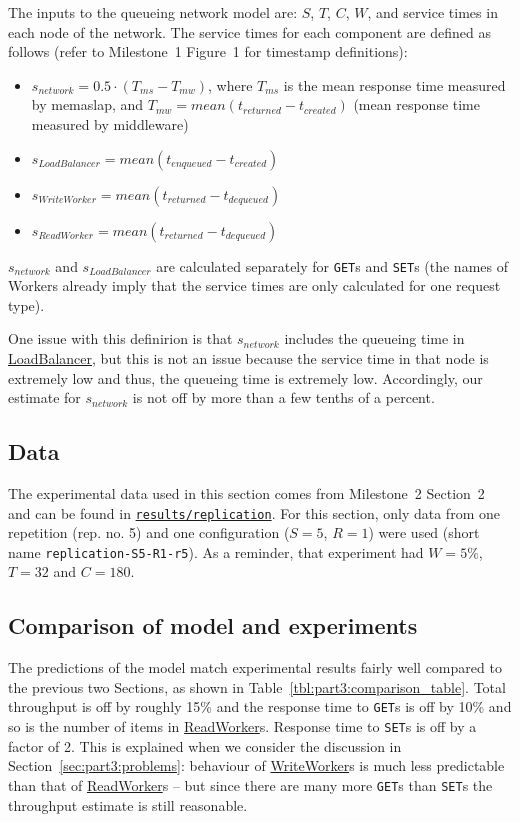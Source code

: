 \documentclass[11pt]{article}
\newcommand{\get}[0]{\texttt{GET}}
\newcommand{\set}[0]{\texttt{SET}}
\newcommand{\linkmain}[1]{\href{https://gitlab.inf.ethz.ch/pungast/asl-fall16-project/blob/master/src/main/java/asl/#1.java}{#1}}
\begin{document}
The inputs to the queueing network model are: $S$, $T$, $C$, $W$, and service times in each node of the network. The service times for each component are defined as follows (refer to Milestone~1 Figure~1 for timestamp definitions):

\begin{itemize}
	\item $s_{network} = 0.5 \cdot (T_{ms} - T_{mw})$, where $T_{ms}$ is the mean response time measured by memaslap, and $T_{mw} = mean(t_{returned}-t_{created})$ (mean response time measured by middleware)
	\item $s_{LoadBalancer} = mean(t_{enqueued}-t_{created})$
	\item $s_{WriteWorker} = mean(t_{returned}-t_{dequeued})$
	\item $s_{ReadWorker} = mean(t_{returned}-t_{dequeued})$
\end{itemize}

$s_{network}$ and $s_{LoadBalancer}$ are calculated separately for \get{}s and \set{}s (the names of Workers already imply that the service times are only calculated for one request type).

One issue with this definirion is that $s_{network}$ includes the queueing time in \linkmain{LoadBalancer}, but this is not an issue because the service time in that node is extremely low and thus, the queueing time is extremely low. Accordingly, our estimate for $s_{network}$ is not off by more than a few tenths of a percent.


\subsection{Data}
\label{sec:part3:data}
The experimental data used in this section comes from Milestone~2 Section~2 and can be found in \texttt{\href{https://gitlab.inf.ethz.ch/pungast/asl-fall16-project/tree/master/results/replication}{results/replication}}. For this section, only data from one repetition (rep. no. 5) and one configuration ($S=5$, $R=1$) were used (short name \texttt{replication-S5-R1-r5}). As a reminder, that experiment had $W=5\%$, $T=32$ and $C=180$.

\subsection{Comparison of model and experiments}


The predictions of the model match experimental results fairly well compared to the previous two Sections, as shown in Table~\ref{tbl:part3:comparison_table}. Total throughput is off by roughly 15\% and the response time to \get{}s is off by 10\% and so is the number of items in \linkmain{ReadWorker}s. Response time to \set{}s is off by a factor of 2. This is explained when we consider the discussion in Section~\ref{sec:part3:problems}: behaviour of \linkmain{WriteWorker}s is much less predictable than that of \linkmain{ReadWorker}s -- but since there are many more \get{}s than \set{}s the throughput estimate is still reasonable.
\end{document}
